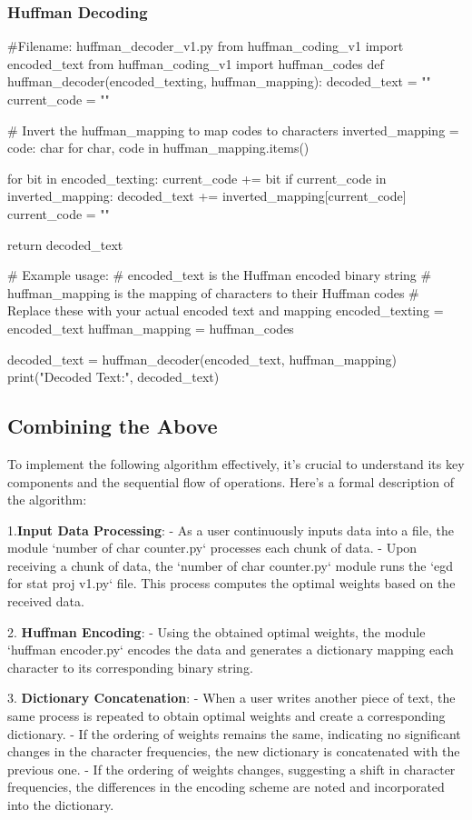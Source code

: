 \documentclass[scrartcl]{article}
\begin{document}
\subsubsection{Huffman Decoding}
\begin{python}
#Filename: huffman_decoder_v1.py
from huffman_coding_v1 import encoded_text
from huffman_coding_v1 import huffman_codes 
def huffman_decoder(encoded_texting, huffman_mapping):
    decoded_text = ""
    current_code = ""
    
    # Invert the huffman_mapping to map codes to characters
    inverted_mapping = {code: char for char, code in huffman_mapping.items()}
    
    for bit in encoded_texting:
        current_code += bit
        if current_code in inverted_mapping:
            decoded_text += inverted_mapping[current_code]
            current_code = ""
    
    return decoded_text

# Example usage:
# encoded_text is the Huffman encoded binary string
# huffman_mapping is the mapping of characters to their Huffman codes
# Replace these with your actual encoded text and mapping
encoded_texting = encoded_text
huffman_mapping = huffman_codes

decoded_text = huffman_decoder(encoded_text, huffman_mapping)
print("Decoded Text:", decoded_text)
\end{python}
\subsection{Combining the Above}
To implement the following algorithm effectively, it's crucial to understand its key components and the sequential flow of operations. Here's a formal description of the algorithm:

1.\textbf{Input Data Processing}:
   - As a user continuously inputs data into a file, the module `number of char counter.py` processes each chunk of data.
   - Upon receiving a chunk of data, the `number of char counter.py` module runs the `egd for stat proj v1.py` file. This process computes the optimal weights based on the received data.

2. \textbf{Huffman Encoding}:
   - Using the obtained optimal weights, the module `huffman encoder.py` encodes the data and generates a dictionary mapping each character to its corresponding binary string.

3. \textbf{Dictionary Concatenation}:
   - When a user writes another piece of text, the same process is repeated to obtain optimal weights and create a corresponding dictionary.
   - If the ordering of weights remains the same, indicating no significant changes in the character frequencies, the new dictionary is concatenated with the previous one.
   - If the ordering of weights changes, suggesting a shift in character frequencies, the differences in the encoding scheme are noted and incorporated into the dictionary.
\end{document}
